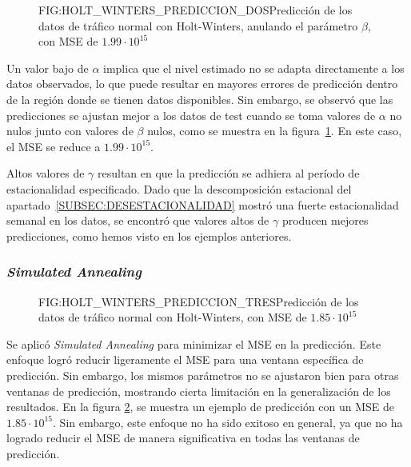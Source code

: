 \begin{figure}[Predicción de los datos de tráfico normal con Holt-Winters, anulando el parámetro $\beta$]{FIG:HOLT_WINTERS_PREDICCION_DOS}{Predicción de los datos de tráfico normal con Holt-Winters, anulando el parámetro $\beta$, con \ac{MSE} de $1.99\cdot 10^{15}$}
    \label{FIG:HOLT_WINTERS_PREDICCION_DOS}
\end{figure}

Un valor bajo de $\alpha$ implica que el nivel estimado no se adapta directamente a los datos observados, lo que puede resultar en mayores errores de predicción dentro de la región donde se tienen datos disponibles. Sin embargo, se observó que las predicciones se ajustan mejor a los datos de test cuando se toma valores de $\alpha$ no nulos junto con valores de $\beta$ nulos, como se muestra en la figura~\ref{FIG:HOLT_WINTERS_PREDICCION_DOS}. En este caso, el \ac{MSE} se reduce a $1.99\cdot 10^{15}$.

Altos valores de $\gamma$ resultan en que la predicción se adhiera al período de estacionalidad especificado.
Dado que la descomposición estacional del apartado~\ref{SUBSEC:DESESTACIONALIDAD} mostró una fuerte estacionalidad semanal en los datos, se encontró que valores altos de $\gamma$ producen mejores predicciones, como hemos visto en los ejemplos anteriores.

\subsubsection{\textit{Simulated Annealing}}

\begin{figure}[Predicción de los datos de tráfico normal con Holt-Winters, con MSE de $1.85\cdot 10^{15}$]{FIG:HOLT_WINTERS_PREDICCION_TRES}{Predicción de los datos de tráfico normal con Holt-Winters, con \ac{MSE} de $1.85\cdot 10^{15}$}
    \label{FIG:HOLT_WINTERS_PREDICCION_TRES}
\end{figure}

Se aplicó \textit{Simulated Annealing} para minimizar el MSE en la predicción. Este enfoque logró reducir ligeramente el MSE para una ventana específica de predicción. Sin embargo, los mismos parámetros no se ajustaron bien para otras ventanas de predicción, mostrando cierta limitación en la generalización de los resultados. En la figura \ref{FIG:HOLT_WINTERS_PREDICCION_TRES}, se muestra un ejemplo de predicción con un MSE de $1.85\cdot 10^{15}$. Sin embargo, este enfoque no ha sido exitoso en general, ya que no ha logrado reducir el MSE de manera significativa en todas las ventanas de predicción.